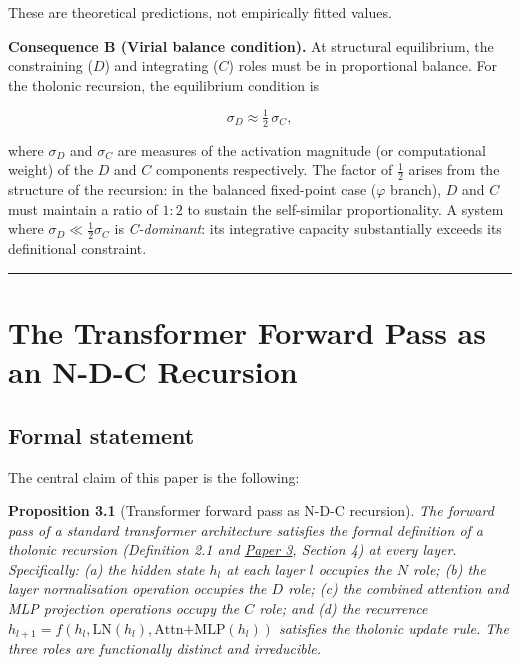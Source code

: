 \documentclass[12pt]{article}
\begin{document}
These are theoretical predictions, not empirically fitted values.

\textbf{Consequence B (Virial balance condition).} At structural
equilibrium, the constraining (\(D\)) and integrating (\(C\)) roles must
be in proportional balance. For the tholonic recursion, the equilibrium
condition is

\[\sigma_D \approx \tfrac{1}{2}\,\sigma_C,\]

where \(\sigma_D\) and \(\sigma_C\) are measures of the activation
magnitude (or computational weight) of the \(D\) and \(C\) components
respectively. The factor of \(\frac{1}{2}\) arises from the structure of
the recursion: in the balanced fixed-point case (\(\varphi\) branch),
\(D\) and \(C\) must maintain a ratio of \(1 : 2\) to sustain the
self-similar proportionality. A system where
\(\sigma_D \ll \frac{1}{2}\sigma_C\) is \emph{C-dominant}: its
integrative capacity substantially exceeds its definitional constraint.

\begin{center}\rule{0.5\linewidth}{0.5pt}\end{center}

\section{The Transformer Forward Pass as an N-D-C Recursion}\label{the-transformer-forward-pass-as-an-n-d-c-recursion}

\subsection{Formal statement}\label{formal-statement}

The central claim of this paper is the following:

\textbf{Proposition 3.1} (Transformer forward pass as N-D-C recursion).
\emph{The forward pass of a standard transformer architecture satisfies
the formal definition of a tholonic recursion (Definition 2.1 and
\href{https://github.com/baardev/truevalue/blob/main/docnav/Research/papers/3_minimal-recursive-triadic-framework/3_minimal-recursive-triadic-framework.pdf}{Paper
3}, Section 4) at every layer. Specifically: (a) the hidden state
\(h_l\) at each layer \(l\) occupies the \(N\) role; (b) the layer
normalisation operation occupies the \(D\) role; (c) the combined
attention and MLP projection operations occupy the \(C\) role; and (d)
the recurrence
\(h_{l+1} = f(h_l, \text{LN}(h_l), \text{Attn+MLP}(h_l))\) satisfies the
tholonic update rule. The three roles are functionally distinct and
irreducible.}
\end{document}
